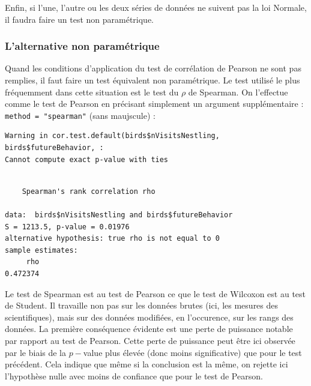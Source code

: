 \documentclass[a4paperpaper,]{article}
\newenvironment{Shaded}{\begin{snugshade}}{\end{snugshade}}
\newcommand{\DataTypeTok}[1]{\textcolor[rgb]{0.00,0.34,0.68}{#1}}
\newcommand{\KeywordTok}[1]{\textcolor[rgb]{0.12,0.11,0.11}{\textbf{#1}}}
\newcommand{\NormalTok}[1]{\textcolor[rgb]{0.12,0.11,0.11}{#1}}
\newcommand{\OperatorTok}[1]{\textcolor[rgb]{0.12,0.11,0.11}{#1}}
\newcommand{\StringTok}[1]{\textcolor[rgb]{0.75,0.01,0.01}{#1}}
\begin{document}
Enfin, si l'une, l'autre ou les deux séries de données ne suivent pas la loi Normale, il faudra faire un test non paramétrique.

\hypertarget{lalternative-non-paramuxe9trique-4}{%
\subsubsection{L'alternative non paramétrique}\label{lalternative-non-paramuxe9trique-4}}

Quand les conditions d'application du test de corrélation de Pearson ne sont pas remplies, il faut faire un test équivalent non paramétrique. Le test utilisé le plus fréquemment dans cette situation est le test du \(\rho\) de Spearman. On l'effectue comme le test de Pearson en précisant simplement un argument supplémentaire : \texttt{method\ =\ "spearman"} (sans maujscule) :

\begin{Shaded}
\end{Shaded}

\begin{verbatim}
Warning in cor.test.default(birds$nVisitsNestling, birds$futureBehavior, :
Cannot compute exact p-value with ties
\end{verbatim}

\begin{verbatim}

    Spearman's rank correlation rho

data:  birds$nVisitsNestling and birds$futureBehavior
S = 1213.5, p-value = 0.01976
alternative hypothesis: true rho is not equal to 0
sample estimates:
     rho 
0.472374 
\end{verbatim}

Le test de Spearman est au test de Pearson ce que le test de Wilcoxon est au test de Student. Il travaille non pas sur les données brutes (ici, les mesures des scientifiques), mais sur des données modifiées, en l'occurence, sur les rangs des données. La première conséquence évidente est une perte de puissance notable par rapport au test de Pearson. Cette perte de puissance peut être ici observée par le biais de la \(p-\)value plus élevée (donc moins significative) que pour le test précédent. Cela indique que même si la conclusion est la même, on rejette ici l'hypothèse nulle avec moins de confiance que pour le test de Pearson.
\end{document}
